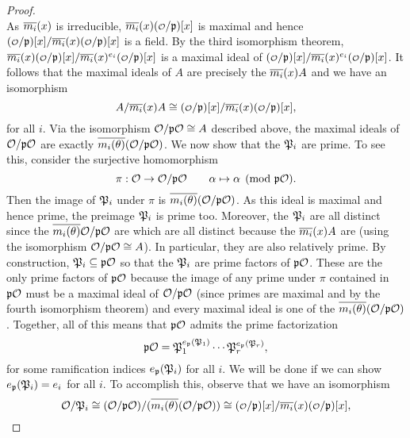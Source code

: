 \begin{proof}
\[      \]
      As $\overline{m_{i}}(x)$ is irreducible, $\conj{m_{i}}(x)(\smc{O}/\mf{p})[x]$ is maximal and hence $(\smc{O}/\mf{p})[x]/\conj{m_{i}}(x)(\smc{O}/\mf{p})[x]$ is a field. By the third isomorphism theorem, $\conj{m_{i}}(x)(\smc{O}/\mf{p})[x]/\conj{m_{i}}(x)^{e_{i}}(\smc{O}/\mf{p})[x]$ is a maximal ideal of $(\smc{O}/\mf{p})[x]/\conj{m_{i}}(x)^{e_{i}}(\smc{O}/\mf{p})[x]$. It follows that the maximal ideals of $A$ are precisely the $\overline{m_{i}}(x)A$ and we have an isomorphism
      \[
        A/\conj{m_{i}}(x)A \cong (\smc{O}/\mf{p})[x]/\conj{m_{i}}(x)(\smc{O}/\mf{p})[x],
      \]
      for all $i$. Via the isomorphism $\mathcal{O}/\mathfrak{p}\mathcal{O} \cong A$ described above, the maximal ideals of $\mathcal{O}/\mathfrak{p}\mathcal{O}$ are exactly $\overline{m_{i}(\theta)}(\mathcal{O}/\mathfrak{p}\mathcal{O})$. We now show that the $\mathfrak{P}_{i}$ are prime. To see this, consider the surjective homomorphism
      \[
        \pi:\mathcal{O} \to \mathcal{O}/\mathfrak{p}\mathcal{O} \qquad \alpha \mapsto \alpha \pmod{\mathfrak{p}\mathcal{O}}.
      \]
      Then the image of $\mathfrak{P}_{i}$ under $\pi$ is $\overline{m_{i}(\theta)}(\mathcal{O}/\mathfrak{p}\mathcal{O})$. As this ideal is maximal and hence prime, the preimage $\mathfrak{P}_{i}$ is prime too. Moreover, the $\mathfrak{P}_{i}$ are all distinct since the $\overline{m_{i}(\theta)}\mathcal{O}/\mathfrak{p}\mathcal{O}$ are which are all distinct because the $\overline{m_{i}}(x)A$ are (using the isomorphism $\mathcal{O}/\mathfrak{p}\mathcal{O} \cong A$). In particular, they are also relatively prime. By construction, $\mathfrak{P}_{i} \subseteq \mathfrak{p}\mathcal{O}$ so that the $\mathfrak{P}_{i}$ are prime factors of $\mathfrak{p}\mathcal{O}$. These are the only prime factors of $\mathfrak{p}\mathcal{O}$ because the image of any prime under $\pi$ contained in $\mathfrak{p}\mathcal{O}$ must be a maximal ideal of $\mathcal{O}/\mathfrak{p}\mathcal{O}$ (since primes are maximal and by the fourth isomorphism theorem) and every maximal ideal is one of the $\overline{m_{i}(\theta)}(\mathcal{O}/\mathfrak{p}\mathcal{O})$. Together, all of this means that $\mathfrak{p}\mathcal{O}$ admits the prime factorization
      \[
        \mathfrak{p}\mathcal{O} = \mathfrak{P}_{1}^{e_{\mathfrak{p}}(\mathfrak{P}_{1})} \cdots \mathfrak{P}_{r}^{e_{\mathfrak{p}}(\mathfrak{P}_{r})},
      \]
      for some ramification indices $e_{\mathfrak{p}}(\mathfrak{P}_{i})$ for all $i$. We will be done if we can show $e_{\mathfrak{p}}(\mathfrak{P}_{i}) = e_{i}$ for all $i$. To accomplish this, observe that we have an isomorphism
      \[
        \mc{O}/\mf{P}_{i} \cong (\mc{O}/\mf{p}\mc{O})/(\conj{m_{i}(\t)}(\mc{O}/\mf{p}\mc{O})) \cong (\smc{O}/\mf{p})[x]/\conj{m_{i}}(x)(\smc{O}/\mf{p})[x],
      \]

\end{proof}
